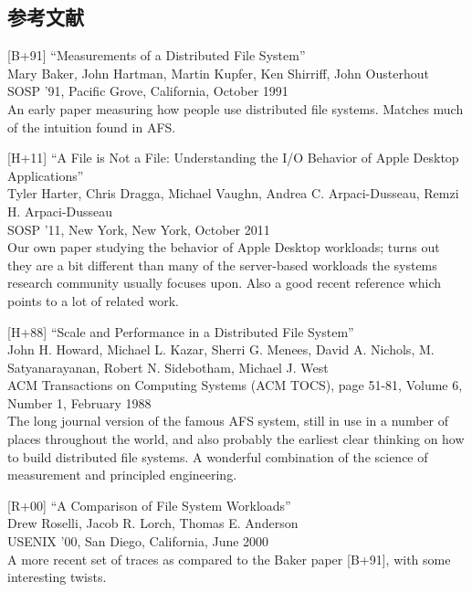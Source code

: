 \hypertarget{ux53c2ux8003ux6587ux732e-35}{%
\subsection*{参考文献}\label{ux53c2ux8003ux6587ux732e-35}}

{[}B+91{]} ``Measurements of a Distributed File System''\\
Mary Baker, John Hartman, Martin Kupfer, Ken Shirriff, John Ousterhout\\
SOSP '91, Pacific Grove, California, October 1991\\
An early paper measuring how people use distributed file systems.
Matches much of the intuition found in AFS.

{[}H+11{]} ``A File is Not a File: Understanding the I/O Behavior of
Apple Desktop Applications''\\
Tyler Harter, Chris Dragga, Michael Vaughn, Andrea C. Arpaci-Dusseau,
Remzi H. Arpaci-Dusseau\\
SOSP '11, New York, New York, October 2011\\
Our own paper studying the behavior of Apple Desktop workloads; turns
out they are a bit different than many of the server-based workloads the
systems research community usually focuses upon. Also a good recent
reference which points to a lot of related work.

{[}H+88{]} ``Scale and Performance in a Distributed File System''\\
John H. Howard, Michael L. Kazar, Sherri G. Menees, David A. Nichols, M.
Satyanarayanan, Robert N. Sidebotham, Michael J. West\\
ACM Transactions on Computing Systems (ACM TOCS), page 51-81, Volume 6,
Number 1, February 1988\\
The long journal version of the famous AFS system, still in use in a
number of places throughout the world, and also probably the earliest
clear thinking on how to build distributed file systems. A wonderful
combination of the science of measurement and principled engineering.

{[}R+00{]} ``A Comparison of File System Workloads''\\
Drew Roselli, Jacob R. Lorch, Thomas E. Anderson\\
USENIX '00, San Diego, California, June 2000\\
A more recent set of traces as compared to the Baker paper {[}B+91{]},
with some interesting twists.

